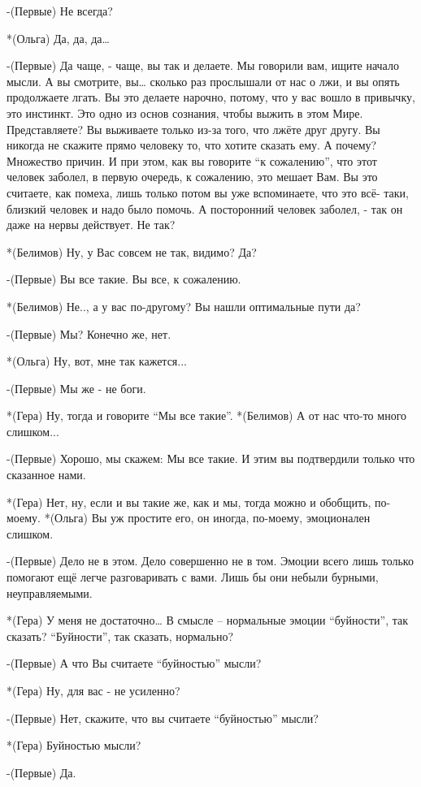 -(Первые) Не всегда?

*(Ольга) Да, да, да…

-(Первые) Да чаще, - чаще, вы так и делаете. Мы говорили вам, ищите начало мысли. А вы смотрите, вы… сколько раз прослышали от нас о лжи, и вы опять продолжаете лгать. Вы это делаете нарочно, потому, что у вас вошло в привычку, это инстинкт. Это одно из основ сознания, чтобы выжить в этом Мире. Представляете? Вы выживаете только из-за того, что лжёте друг другу. Вы никогда не скажите прямо человеку то, что хотите сказать ему. А почему? Множество причин. И при этом, как вы говорите “к сожалению”, что этот человек заболел, в первую очередь, к сожалению, это мешает Вам. Вы это считаете, как помеха, лишь только потом вы уже вспоминаете, что это всё- таки,  близкий человек  и надо было помочь. А посторонний человек заболел, - так он даже на нервы действует. Не так?

*(Белимов) Ну, у Вас совсем не так, видимо? Да?

-(Первые) Вы все такие. Вы все, к сожалению.

*(Белимов) Не.., а у вас по-другому? Вы нашли оптимальные пути да?

-(Первые) Мы? Конечно же, нет. 

*(Ольга) Ну, вот, мне так кажется...

-(Первые) Мы же - не боги.

*(Гера) Ну, тогда и говорите “Мы все такие”.
*(Белимов) А от нас что-то много слишком...

-(Первые) Хорошо, мы скажем: Мы все такие. И этим вы подтвердили только что сказанное нами.

*(Гера) Нет, ну, если и вы такие же, как и мы, тогда можно и обобщить, по-моему.
*(Ольга) Вы уж простите его, он иногда, по-моему, эмоционален слишком.

-(Первые) Дело не в этом. Дело совершенно не в том. Эмоции  всего лишь только помогают ещё легче разговаривать с вами. Лишь бы они небыли бурными, неуправляемыми.

*(Гера) У меня не достаточно… В смысле – нормальные эмоции “буйности”, так сказать?  “Буйности”, так сказать, нормально?

-(Первые) А что Вы считаете “буйностью” мысли?

*(Гера) Ну, для вас - не усиленно?

-(Первые) Нет, скажите, что вы считаете “буйностью” мысли?

*(Гера) Буйностью мысли?

-(Первые) Да.

